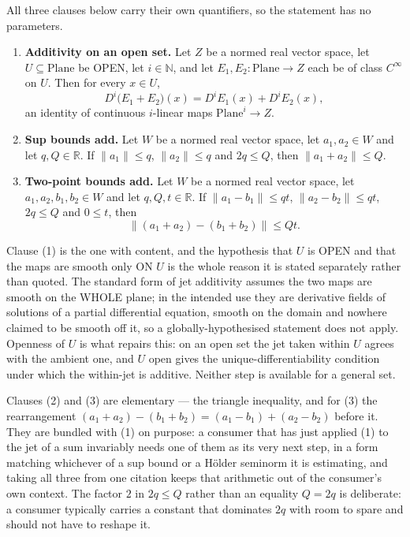\begin{lemma}
All three clauses below carry their own quantifiers, so the statement has no parameters.
\begin{enumerate}
\item[(1)] \textbf{Additivity on an open set.}  Let $Z$ be a normed real vector space, let
$U\subseteq\mathrm{Plane}$ be OPEN, let $i\in\mathbb{N}$, and let
$E_1,E_2\colon\mathrm{Plane}\to Z$ each be of class $C^{\infty}$ on $U$.  Then for every
$x\in U$,
\[
  D^{i}\bigl(E_1+E_2\bigr)(x)=D^{i}E_1(x)+D^{i}E_2(x),
\]
an identity of continuous $i$-linear maps $\mathrm{Plane}^{i}\to Z$.
\item[(2)] \textbf{Sup bounds add.}  Let $W$ be a normed real vector space, let $a_1,a_2\in W$
and let $q,Q\in\mathbb{R}$.  If $\lVert a_1\rVert\le q$, $\lVert a_2\rVert\le q$ and
$2q\le Q$, then $\lVert a_1+a_2\rVert\le Q$.
\item[(3)] \textbf{Two-point bounds add.}  Let $W$ be a normed real vector space, let
$a_1,a_2,b_1,b_2\in W$ and let $q,Q,t\in\mathbb{R}$.  If
$\lVert a_1-b_1\rVert\le qt$, $\lVert a_2-b_2\rVert\le qt$, $2q\le Q$ and $0\le t$, then
\[
  \bigl\lVert(a_1+a_2)-(b_1+b_2)\bigr\rVert\le Qt .
\]
\end{enumerate}

Clause (1) is the one with content, and the hypothesis that $U$ is OPEN and that the maps are
smooth only ON $U$ is the whole reason it is stated separately rather than quoted.  The standard
form of jet additivity assumes the two maps are smooth on the WHOLE plane; in the intended use
they are derivative fields of solutions of a partial differential equation, smooth on the domain
and nowhere claimed to be smooth off it, so a globally-hypothesised statement does not apply.
Openness of $U$ is what repairs this: on an open set the jet taken within $U$ agrees with the
ambient one, and $U$ open gives the unique-differentiability condition under which the
within-jet is additive.  Neither step is available for a general set.

Clauses (2) and (3) are elementary --- the triangle inequality, and for (3) the rearrangement
$(a_1+a_2)-(b_1+b_2)=(a_1-b_1)+(a_2-b_2)$ before it.  They are bundled with (1) on purpose: a
consumer that has just applied (1) to the jet of a sum invariably needs one of them as its very
next step, in a form matching whichever of a sup bound or a H\"older seminorm it is estimating,
and taking all three from one citation keeps that arithmetic out of the consumer's own context.
The factor $2$ in $2q\le Q$ rather than an equality $Q=2q$ is deliberate: a consumer typically
carries a constant that dominates $2q$ with room to spare and should not have to reshape it.
\end{lemma}
